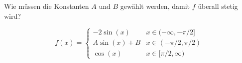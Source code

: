 \item Wie müssen die Konstanten $A$ und $B$ gewählt werden, damit $f$ überall stetig wird?

$$
  f(x) = \begin{cases}-2\sin(x) & x\in (-\infty,-\pi/2] \\ A\sin(x)+B & x \in (-\pi/2,\pi/2) \\ \cos(x) & x \in [\pi/2,\infty) \end{cases}
$$